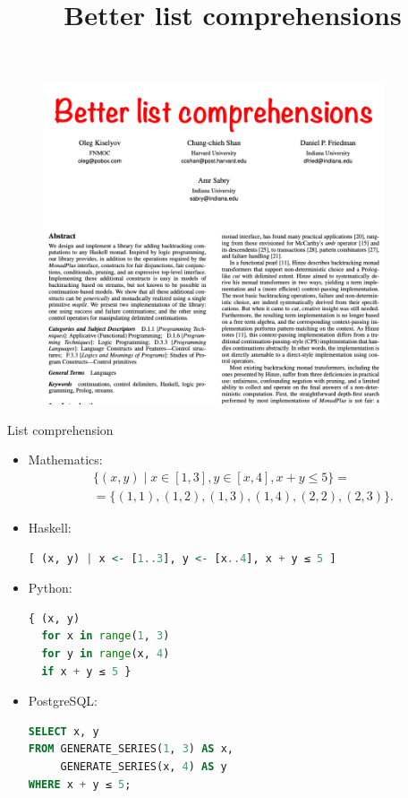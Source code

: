 \documentclass[handout]{beamer}
\def\le{\leqslant}
\begin{document}
\title{Better list comprehensions}

\begin{frame}
\begin{figure}[H]
\centering
\includegraphics[width=0.9\textwidth]{better-list-comprehensions.png}
\end{figure}
\end{frame}


\begin{frame}[fragile]{List comprehension}

\vspace{-1.4ex}

\begin{itemize}[<+->]

\item Mathematics:
\begin{multline*}
\{ (x, y) \mid x \in [1,3], y \in [x,4], x + y \le 5 \}
= \\ =
\{ (1, 1), (1, 2), (1, 3), (1, 4), (2, 2), (2, 3) \}.
\end{multline*}

\item Haskell:
\begin{lstlisting}[language=Haskell]
[ (x, y) | x <- [1..3], y <- [x..4], x + y ≤ 5 ]
\end{lstlisting}

\item Python:
\begin{lstlisting}[language=Python]
{ (x, y)
  for x in range(1, 3)
  for y in range(x, 4)
  if x + y ≤ 5 }
\end{lstlisting}

\item PostgreSQL:
\begin{lstlisting}[language=SQL]
SELECT x, y
FROM GENERATE_SERIES(1, 3) AS x,
     GENERATE_SERIES(x, 4) AS y
WHERE x + y ≤ 5;
\end{lstlisting}

\end{itemize}

\end{frame}
\end{document}
